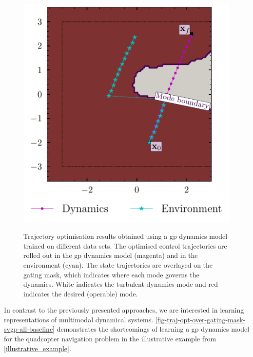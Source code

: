\documentclass{mimosis-class/mimosis}
\numberwithin{equation}{chapter}
\begin{document}
\begin{figure}[t!]
\begin{minipage}{0.49\textwidth}
\includegraphics[width=\textwidth]{./images/traj-opt/mode-remaining/scenario_7_svgp_baseline_desired_mode.pdf}
\label{fig-traj-opt-over-gating-mask-svgp-desired-baseline}
\end{minipage}
\caption[Motivation for multimodal dynamical models]{
Trajectory optimisation results obtained using a \acrshort{gp} dynamics model trained on different data sets.
The optimised control trajectories are rolled out in the \acrshort{gp} dynamics model (magenta) and in the environment (cyan).
The state trajectories are overlayed on the gating mask, which indicates where each mode governs the dynamics.
White indicates the turbulent dynamics mode and red indicates the desired (operable) mode.}
\label{fig-traj-opt-over-gating-mask-svgp-baseline}
\end{figure}
In contrast to the previously presented  approaches, we are interested in learning representations
of multimodal dynamical systems.
\cref{fig-traj-opt-over-gating-mask-svgp-all-baseline}
demonstrates the shortcomings of learning a \acrshort{gp} dynamics model for the quadcopter navigation problem in the
illustrative example from \cref{illustrative_example}.
\end{document}
